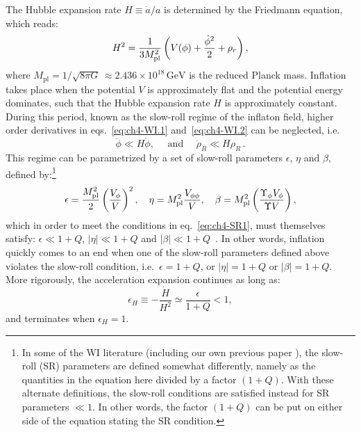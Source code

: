 The Hubble expansion rate $H\equiv \dot{a}/a$ is determined by the Friedmann equation, which reads:
\begin{equation}
    H^2=\frac{1}{3M^2_{\rm{pl}}}\left( V(\phi)+\frac{\dot{\phi}^2}{2}+\rho_r\right), \label{eq:ch4-WI.4}
\end{equation}
where $M_{\mathrm{pl}}= 1/\sqrt{8 \pi G} \, \approx 2.436\times 10^{18}\,\mathrm{GeV}$ is the reduced Planck mass.
Inflation takes place when the potential $V$ is approximately flat and the potential energy
dominates, such that the Hubble expansion rate $H$ is approximately constant. During this period, known as the slow-roll regime of the inflaton field, higher order derivatives in eqs.~\eqref{eq:ch4-WI.1} and~\eqref{eq:ch4-WI.2} can be neglected, i.e.
\begin{equation}
    \ddot{\phi} \ll H \dot{\phi}, \quad \text { and } \quad \dot{\rho}_{R} \ll H \rho_{R}\,. \label{eq:ch4-SR1}
\end{equation}
This regime can be parametrized by a set of slow-roll parameters $\epsilon$, $\eta$ and $\beta$,
defined by:\footnote{In some of the WI literature (including our own previous paper \cite{Montefalcone:2022jfw}), the slow-roll (SR) parameters are defined somewhat differently, namely as the quantities in the equation here divided by a factor $(1+Q)$. With these alternate definitions, the slow-roll conditions are satisfied instead for SR parameters $\ll1$. In other words, the factor $(1+Q)$ can be put on either side of the equation stating the SR condition.}
\begin{equation}
\epsilon=\frac{M^2_{\rm{pl}}}{2}\left(\frac{V_\phi}{V}\right)^2, \quad \eta=M^2_{\rm{pl}} \frac{V_{\phi \phi}}{V}, \quad \beta=M^2_{\rm{pl}}\left(\frac{\Upsilon_\phi V_\phi}{\Upsilon V}\right),
\end{equation}
which in order to meet the conditions in eq.~\eqref{eq:ch4-SR1}, must themselves satisfy: $\epsilon \ll 1+Q$, $|\eta| \ll 1+Q$ and $|\beta| \ll 1+Q$~\cite{Taylor:2000ze, Hall:2003zp, Bastero-Gil:2004oun, Moss:2008yb}. In other words, inflation quickly comes to an end when one of the slow-roll parameters defined above violates the slow-roll
condition, i.e.\ $\epsilon= 1+Q$, or $|\eta|=1+Q$ or $|\beta|=1+Q$.
More rigorously, the acceleration expansion continues as long as:
\begin{equation}
    \epsilon_H\equiv -\frac{\dot{H}}{H^2}\simeq \frac{\epsilon}{1+Q} <1, \label{eq:ch4-epsH}  
\end{equation}
and terminates when $\epsilon_H=1$.

